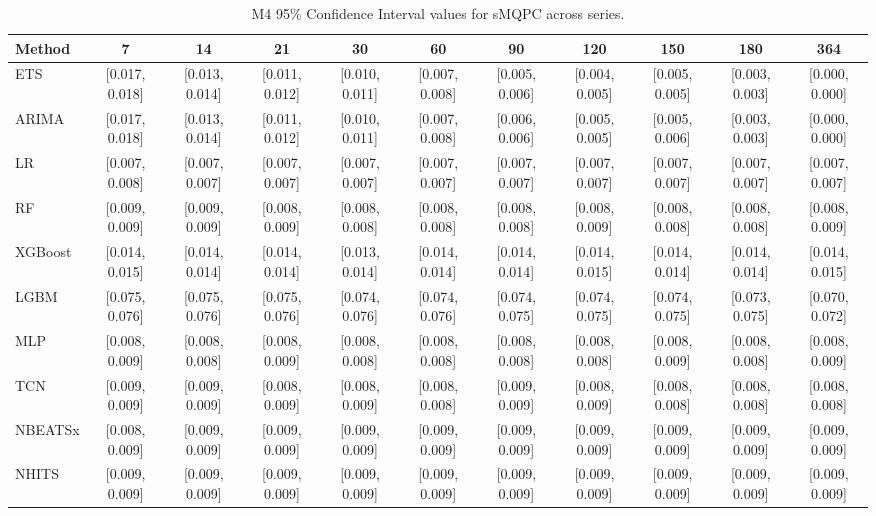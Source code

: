 \begin{table}[!ht]
\centering
\begin{adjustbox}{max width=\textwidth}
\begin{tabular}{lcccccccccc}
\toprule
Method & 7 & 14 & 21 & 30 & 60 & 90 & 120 & 150 & 180 & 364 \\
\midrule
ETS & [0.017, 0.018] & [0.013, 0.014] & [0.011, 0.012] & [0.010, 0.011] & [0.007, 0.008] & [0.005, 0.006] & [0.004, 0.005] & [0.005, 0.005] & [0.003, 0.003] & [0.000, 0.000] \\
ARIMA & [0.017, 0.018] & [0.013, 0.014] & [0.011, 0.012] & [0.010, 0.011] & [0.007, 0.008] & [0.006, 0.006] & [0.005, 0.005] & [0.005, 0.006] & [0.003, 0.003] & [0.000, 0.000] \\
LR & [0.007, 0.008] & [0.007, 0.007] & [0.007, 0.007] & [0.007, 0.007] & [0.007, 0.007] & [0.007, 0.007] & [0.007, 0.007] & [0.007, 0.007] & [0.007, 0.007] & [0.007, 0.007] \\
RF & [0.009, 0.009] & [0.009, 0.009] & [0.008, 0.009] & [0.008, 0.008] & [0.008, 0.008] & [0.008, 0.008] & [0.008, 0.009] & [0.008, 0.008] & [0.008, 0.008] & [0.008, 0.009] \\
XGBoost & [0.014, 0.015] & [0.014, 0.014] & [0.014, 0.014] & [0.013, 0.014] & [0.014, 0.014] & [0.014, 0.014] & [0.014, 0.015] & [0.014, 0.014] & [0.014, 0.014] & [0.014, 0.015] \\
LGBM & [0.075, 0.076] & [0.075, 0.076] & [0.075, 0.076] & [0.074, 0.076] & [0.074, 0.076] & [0.074, 0.075] & [0.074, 0.075] & [0.074, 0.075] & [0.073, 0.075] & [0.070, 0.072] \\
MLP & [0.008, 0.009] & [0.008, 0.008] & [0.008, 0.009] & [0.008, 0.008] & [0.008, 0.008] & [0.008, 0.008] & [0.008, 0.008] & [0.008, 0.009] & [0.008, 0.008] & [0.008, 0.009] \\
TCN & [0.009, 0.009] & [0.009, 0.009] & [0.008, 0.009] & [0.008, 0.009] & [0.008, 0.008] & [0.009, 0.009] & [0.008, 0.009] & [0.008, 0.008] & [0.008, 0.008] & [0.008, 0.008] \\
NBEATSx & [0.008, 0.009] & [0.009, 0.009] & [0.009, 0.009] & [0.009, 0.009] & [0.009, 0.009] & [0.009, 0.009] & [0.009, 0.009] & [0.009, 0.009] & [0.009, 0.009] & [0.009, 0.009] \\
NHITS & [0.009, 0.009] & [0.009, 0.009] & [0.009, 0.009] & [0.009, 0.009] & [0.009, 0.009] & [0.009, 0.009] & [0.009, 0.009] & [0.009, 0.009] & [0.009, 0.009] & [0.009, 0.009] \\
\bottomrule
\end{tabular}
\end{adjustbox}
\caption{M4 95\% Confidence Interval values for sMQPC across series.}
\label{tab:ci_m4_smqpc}
\end{table}

